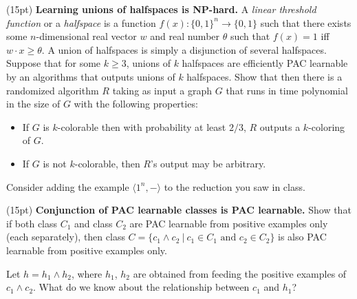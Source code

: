 \documentclass[11pt]{article}
\DeclareMathOperator{\1}{\mathbbm{1}}
\begin{document}
\begin{problem}(15pt) \textbf{Learning unions of halfspaces is NP-hard.} A {\em linear threshold function} or a {\em halfspace} is a function
$f(x): \{0,1\}^n \rightarrow \{0,1\}$ such that there exists some
$n$-dimensional real vector $w$ and real number $\theta$ such that
$f(x) = 1$ iff $w \cdot x \geq \theta.$ 
A union of halfspaces is simply a disjunction of several halfspaces. Suppose that for some $k \ge 3$, unions of $k$ halfspaces are
efficiently PAC learnable by an algorithms that outputs unions of $k$ halfspaces. 
Show that then there is a randomized algorithm $R$ taking as input a graph
$G$ that runs in
time polynomial in the size of $G$ with the
following properties:
\begin{itemize}
\item If $G$ is $k$-colorable then with probability
at least $2/3$, $R$ outputs a $k$-coloring of $G$.
\item If $G$ is not $k$-colorable, then $R$'s output may be arbitrary.
\end{itemize}

\hint Consider adding the example $\langle 1^n, - \rangle$ to the reduction you saw in class.
\end{problem}



\begin{problem}(15pt) \textbf{Conjunction of PAC learnable classes is PAC learnable.}  
Show that if both class $C_1$ and class $C_2$ are PAC learnable from
positive examples only (each separately), then class $C=\{c_1\wedge c_2\ |\
c_1\in C_1\mbox{ and } c_2\in C_2\}$ is also PAC learnable from positive
examples only.
\end{problem} 
\begin{hint}
Let $h = h_1 \wedge h_2$, where $h_1$, $h_2$ are obtained from feeding the positive 
examples of $c_1\wedge c_2$. What do we know about the relationship between $c_1$
and $h_1$?
\end{hint}


\end{document}
